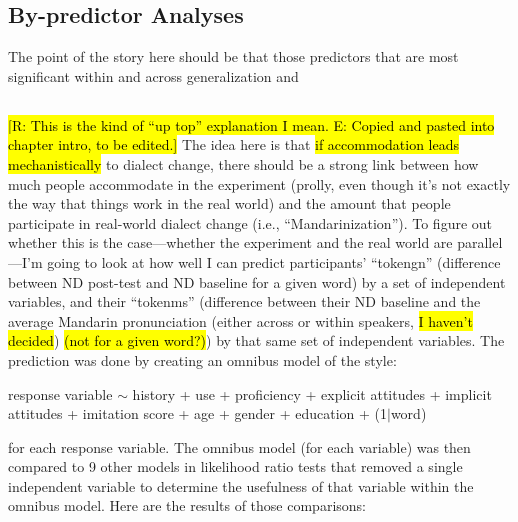 \subsection{By-predictor Analyses}
The point of the story here should be that those predictors that are most significant within and across generalization and 
\subsection{}
\label{upTopStuff}
\hl{[R: This is the kind of ``up top'' explanation I mean. E: Copied and pasted into chapter intro, to be edited.]} The idea here is that \hl{if accommodation leads mechanistically} to dialect change, there should be a strong link between how much people accommodate in the experiment (prolly, even though it's not exactly the way that things work in the real world) and the amount that people participate in real-world dialect change (i.e., ``Mandarinization''). To figure out whether this is the case---whether the experiment and the real world are parallel---I'm going to look at how well I can predict participants' ``tokengn'' (difference between ND post-test and ND baseline for a given word) by a set of independent variables, and their ``tokenms'' (difference between their ND baseline and the average Mandarin pronunciation (either across or within speakers, \hl{I haven't decided}) \hl{(not for a given word?)}) by that same set of independent variables. The prediction was done by creating an omnibus model of the style:

response variable $\sim$ history + use + proficiency + explicit attitudes + implicit attitudes + imitation score + age + gender + education + (1$|$word)

for each response variable. The omnibus model (for each variable) was then compared to 9 other models in likelihood ratio tests that removed a single independent variable to determine the usefulness of that variable within the omnibus model. Here are the results of those comparisons:

